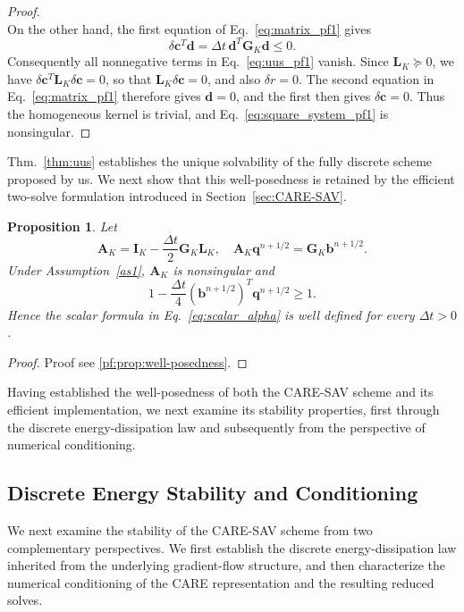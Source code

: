 \documentclass[10pt,reqno]{amsart}
\newtheorem{prop}{Proposition}[section]
\newenvironment{proposition}{\begin{prop}}{\end{prop}}
\theoremstyle{remark}
\theoremstyle{definition}
\begin{document}
\begin{proof}
\begin{equation}
  \end{equation}
  On the other hand, the first equation of Eq.~\eqref{eq:matrix_pf1} gives
  \begin{equation}
    \delta\boldsymbol c^{T}\boldsymbol d =\Delta t\,\boldsymbol d^{T}\boldsymbol{G}_K\boldsymbol d\le0.
  \end{equation}
  Consequently all nonnegative terms in Eq.~\eqref{eq:uus_pf1} vanish. Since $\boldsymbol{L}_K\succeq0$, we have $\delta\boldsymbol c^{T}\boldsymbol{L}_K\delta\boldsymbol c=0$, so that $\boldsymbol{L}_K\delta\boldsymbol c=0$, and also $\delta r=0$. The second equation in Eq.~\eqref{eq:matrix_pf1} therefore gives $\boldsymbol d=0$, and the first then gives $\delta\boldsymbol c=0$. Thus the homogeneous kernel is trivial, and Eq.~\eqref{eq:square_system_pf1} is nonsingular.
\end{proof}

Thm.~\ref{thm:uus} establishes the unique solvability of the fully discrete scheme proposed by us. We next show that this well-posedness is retained by the efficient two-solve formulation introduced in Section~\ref{sec:CARE-SAV}.
\begin{proposition}
\label{prop:well-posedness}
  Let
  $$
  \boldsymbol{A}_K=\boldsymbol{I}_K-\frac{\Delta t}{2}\boldsymbol{G}_K\boldsymbol{L}_K,
  \quad
  \boldsymbol{A}_K\boldsymbol q^{n+1/2}=\boldsymbol{G}_K\boldsymbol b^{n+1/2}.
  $$
  Under Assumption~\ref{as1}, $\boldsymbol{A}_K$ is nonsingular and
  \begin{equation}
    \label{eq:main_prop2}
    1-\frac{\Delta t}{4} (\boldsymbol b^{n+1/2})^{T}\boldsymbol q^{n+1/2}\ge1.
  \end{equation}
  Hence the scalar formula in Eq.~\eqref{eq:scalar_alpha} is well defined for every $\Delta t>0$.
\end{proposition}
\begin{proof}
  Proof see \cref{pf:prop:well-posedness}.
\end{proof}

Having established the well-posedness of both the CARE-SAV scheme and its efficient implementation, we next examine its stability properties, first through the discrete energy-dissipation law and subsequently from the perspective of numerical conditioning.

\subsection{Discrete Energy Stability and Conditioning}
We next examine the stability of the CARE-SAV scheme from two complementary perspectives. We first establish the discrete energy-dissipation law inherited from the underlying gradient-flow structure, and then characterize the numerical conditioning of the CARE representation and the resulting reduced solves.
\end{document}
